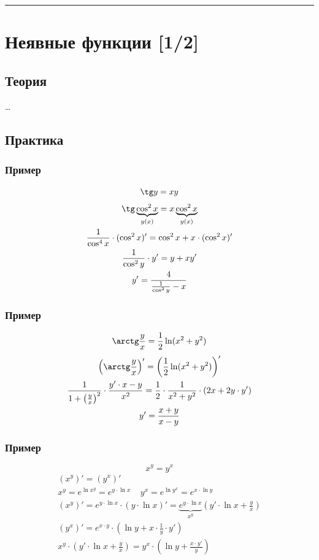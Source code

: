 \documentclass{article}
\begin{document}
\par\noindent\rule{\textwidth}{1pt}
\section{Неявные функции [1/2]}

\subsection{Теория}
\dots


\subsection{Практика}

\subsubsection{Пример}
\[
    \tg y = xy
\]
\begin{gather*}
    \tg \underbrace{\cos^2 x}_{y(x)} = x \underbrace{\cos^2 x}_{y(x)} \\
    \frac{1}{\cos^4 x} \cdot (\cos^2 x)' = \cos^2 x + x \cdot (\cos^2 x)' \\
    \frac{1}{\cos^2 y} \cdot y' = y + xy' \\
    y' = \frac{4}{\frac{1}{\cos^2 y} - x}
\end{gather*}

\subsubsection{Пример}
\[
    \arctg \frac{y}{x} = \frac{1}{2} \ln(x^2 + y^2)
\]
\begin{gather*}
    \left( \arctg \frac{y}{x} \right)' = \left( \frac{1}{2} \ln(x^2 + y^2) \right)' \\
    \frac{1}{1 + \left( \frac{y}{x} \right)^2} \cdot \frac{y' \cdot x - y}{x^2} =
    \frac{1}{2} \cdot \frac{1}{x^2 + y^2} \cdot (2x + 2y \cdot y') \\
    y' = \frac{x + y}{x - y}
\end{gather*}

\subsubsection{Пример}
\[
    x^y = y^x
\]
\begin{gather*}
    (x^y)' = (y^x)' \\
    x^y = e^{\ln x^y} = e^{y \cdot \ln x} ~~~~~ y^x = e^{\ln y^x} = e^{x \cdot \ln y} \\
    (x^y)' = e^{y \cdot \ln x} \cdot (y \cdot \ln x)' =
    \underbrace{e^{y \cdot \ln x}}_{x^y} \left( y' \cdot \ln x + \frac{y}{x} \right) \\
    (y^x)' = e^{x \cdot y} \cdot \left( \ln y + x \cdot \frac{1}{y} \cdot y' \right) \\
    x^y \cdot \left( y' \cdot \ln x + \frac{y}{x} \right) = 
    y^x \cdot \left( \ln y + \frac{x \cdot y'}{y} \right)
\end{gather*}
\end{document}
